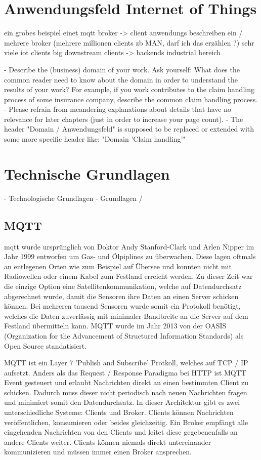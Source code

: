 \section{Anwendungsfeld Internet of Things}

ein grobes beispiel einet mqtt broker -> client anwendungs beschreiben
ein / mehrere broker (mehrere millionen clients zb MAN, darf ich das erzählen ?)
sehr viele iot clients
big downstream clients -> backends
industrial bereich

- Describe the (business) domain of your work. Ask yourself: What does the common reader need to know about the domain in order to understand the results of your work? For example, if you work contributes to the claim handling process of some insurance company, describe the common claim handling process.
- Please refrain from meandering explanations about details that have no relevance for later chapters (just in order to increase your page count).
- The header "Domain / Anwendungsfeld" is supposed to be replaced or extended with some more specific header like: "Domain 'Claim handling'"

\section{Technische Grundlagen} - Technologische Grundlagen - Grundlagen /

\subsection{MQTT}
\acrfull{mqtt} wurde ursprünglich von Doktor Andy Stanford-Clark und Arlen Nipper im Jahr 1999 entworfen um Gas- und Ölpiplines zu überwachen. Diese lagen oftmals an entlegenen Orten wie zum Beispiel auf Übersee und konnten nicht mit Radiowellen oder einem Kabel zum Festland erreicht werden. Zu dieser Zeit war die einzige Option eine Satellitenkommunikation, welche auf Datendurchsatz abgerechnet wurde, damit die Sensoren ihre Daten an einen Server schicken können. Bei mehreren tausend Sensoren wurde somit ein Protokoll benötigt, welches die Daten zuverlässig mit minimaler Bandbreite an die Server auf dem Festland übermitteln kann.
MQTT wurde im Jahr 2013 von der OASIS (Organization for the Advancement of Structured Information Standards) als Open Source standatisiert.

MQTT ist ein Layer 7 'Publish and Subscribe' Protkoll, welches auf TCP / IP aufsetzt. Anders als das Request / Response Paradigma bei HTTP ist MQTT Event gesteuert und erlaubt Nachrichten direkt an einen bestimmten Client zu schicken. Dadurch muss dieser nicht periodisch nach neuen Nachrichten fragen und minimiert somit den Datendurchsatz.
In dieser Architektur gibt es zwei unterschiedliche Systeme: Clients und Broker. Clients können Nachrichten veröffentlichen, konsumieren oder beides gleichzeitig.
Ein Broker empfängt alle eingehenden Nachrichten von den Clients und leitet diese gegebenenfalls an andere Clients weiter. Clients können niemals direkt untereinander kommunizieren und müssen immer einen Broker ansprechen.

